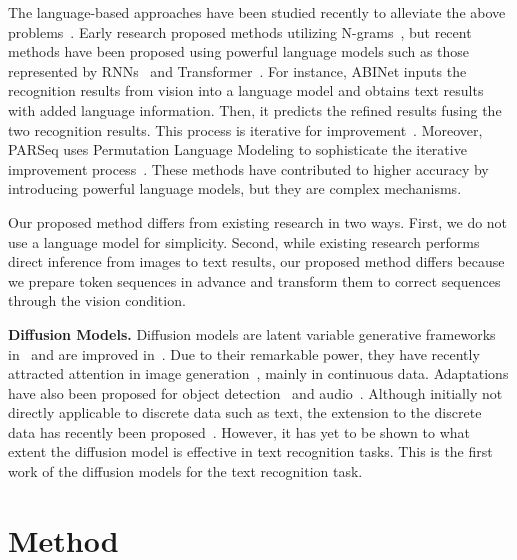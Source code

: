 \documentclass{article}
\begin{document}
The language-based approaches have been studied recently to alleviate the above problems~\cite{fang2021ABINet}.
Early research proposed methods utilizing N-grams~\cite{jaderberg2014MJSynth}, but recent methods have been proposed using powerful language models such as those represented by RNNs~\cite{shi2018aster} and Transformer~\cite{fang2021ABINet}.
For instance, ABINet inputs the recognition results from vision into a language model and obtains text results with added language information. 
Then, it predicts the refined results fusing the two recognition results.
This process is iterative for improvement~\cite{fang2021ABINet}.
Moreover, PARSeq uses Permutation Language Modeling to sophisticate the iterative improvement process~\cite{bautista2022parseq}.
These methods have contributed to higher accuracy by introducing powerful language models, but they are complex mechanisms.

Our proposed method differs from existing research in two ways.
First, we do not use a language model for simplicity.
Second, while existing research performs direct inference from images to text results, our proposed method differs because we prepare token sequences in advance and transform them to correct sequences through the vision condition.




\noindent
\textbf{Diffusion Models.}
Diffusion models are latent variable generative frameworks in~\cite{sohl2015diffusionmodel} and are improved in~\cite{ho2020ddpm}.
Due to their remarkable power, they have recently attracted attention in image generation~\cite{sohl2015diffusionmodel, ho2020ddpm,ramesh2022hierarchical}, mainly in continuous data.
Adaptations have also been proposed for object detection~\cite{chen2022diffusiondet} and audio~\cite{kong2021diffwave}.
Although initially not directly applicable to discrete data such as text, the extension to the discrete data has recently been proposed~\cite{Hoogeboom2021argmax}.
However, it has yet to be shown to what extent the diffusion model is effective in text recognition tasks.
This is the first work of the diffusion models for the text recognition task. \label{sec:relatedwork}

\section{Method} \label{sec:method}
\end{document}
